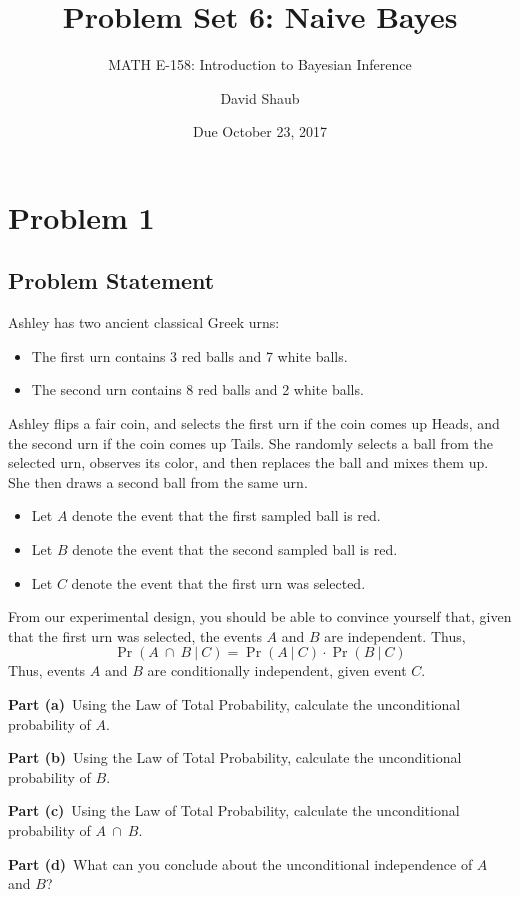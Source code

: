 \documentclass[12pt]{article}
\title{Problem Set 6: Naive Bayes}
\author{MATH E-158: Introduction to Bayesian Inference}
\author{David Shaub}
\date{Due October 23, 2017}
\theoremstyle{definition}
\begin{document}
	
	\maketitle


\section*{Problem 1}


\subsection*{Problem Statement}

Ashley has two ancient classical Greek urns:
\begin{itemize}
	\item The first urn contains 3 red balls and 7 white balls.
	\item The second urn contains 8 red balls and 2 white balls.
\end{itemize}
Ashley flips a fair coin, and selects the first urn if the coin comes up Heads, and the second urn if the coin comes up Tails. She randomly selects a ball from the selected urn, observes its color, and then replaces the ball and mixes them up. She then draws a second ball from the same urn.
\begin{itemize}
	\item Let $A$ denote the event that the first sampled ball is red.
	\item Let $B$ denote the event that the second sampled ball is red.
	\item Let $C$ denote the event that the first urn was selected.
\end{itemize}
From our experimental design, you should be able to convince yourself that, given that the first urn was selected, the events $A$ and $B$ are independent. Thus,
$$
\Pr(A\ \cap\ B\ |\ C) = \Pr(A\ |\ C) \cdot \Pr(B\ |\ C)
$$
Thus, events $A$ and $B$ are conditionally independent, given event $C$.

\bigskip
\noindent
{\bf Part (a)}\ Using the Law of Total Probability, calculate the unconditional probability of $A$.

\bigskip
\noindent
{\bf Part (b)}\ Using the Law of Total Probability, calculate the unconditional probability of $B$.


\bigskip
\noindent
{\bf Part (c)}\ Using the Law of Total Probability, calculate the unconditional probability of $A\ \cap\ B$.


\bigskip
\noindent
{\bf Part (d)}\ What can you conclude about the unconditional independence of $A$ and $B$?
\end{document}
